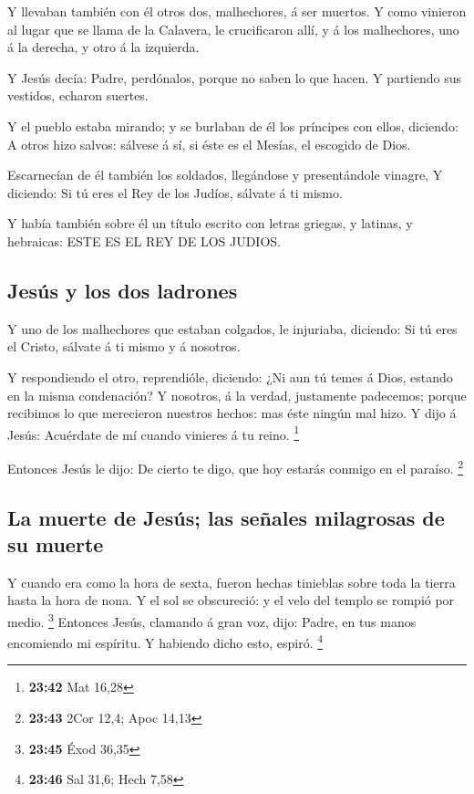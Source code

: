  Y llevaban también con él otros dos, malhechores, á ser
muertos.  Y como vinieron al lugar que se llama de la
Calavera, le crucificaron allí, y á los malhechores, uno á la derecha, y
otro á la izquierda.

 Y Jesús decía: Padre, perdónalos, porque no saben lo que
hacen. Y partiendo sus vestidos, echaron suertes.

 Y el pueblo estaba mirando; y se burlaban de él los
príncipes con ellos, diciendo: A otros hizo salvos: sálvese á sí, si
éste es el Mesías, el escogido de Dios.

 Escarnecían de él también los soldados, llegándose y
presentándole vinagre,  Y diciendo: Si tú eres el Rey de
los Judíos, sálvate á ti mismo.

 Y había también sobre él un título escrito con letras
griegas, y latinas, y hebraicas: ESTE ES EL REY DE LOS JUDIOS.

\hypertarget{jesuxfas-y-los-dos-ladrones}{%
\subsection{Jesús y los dos
ladrones}\label{jesuxfas-y-los-dos-ladrones}}

 Y uno de los malhechores que estaban colgados, le
injuriaba, diciendo: Si tú eres el Cristo, sálvate á ti mismo y á
nosotros.

 Y respondiendo el otro, reprendióle, diciendo: ¿Ni aun
tú temes á Dios, estando en la misma condenación?  Y
nosotros, á la verdad, justamente padecemos; porque recibimos lo que
merecieron nuestros hechos: mas éste ningún mal hizo.  Y
dijo á Jesús: Acuérdate de mí cuando vinieres á tu reino. \footnote{\textbf{23:42}
  Mat 16,28}

 Entonces Jesús le dijo: De cierto te digo, que hoy
estarás conmigo en el paraíso. \footnote{\textbf{23:43} 2Cor 12,4; Apoc
  14,13}

\hypertarget{la-muerte-de-jesuxfas-las-seuxf1ales-milagrosas-de-su-muerte}{%
\subsection{La muerte de Jesús; las señales milagrosas de su
muerte}\label{la-muerte-de-jesuxfas-las-seuxf1ales-milagrosas-de-su-muerte}}

 Y cuando era como la hora de sexta, fueron hechas
tinieblas sobre toda la tierra hasta la hora de nona.  Y
el sol se obscureció: y el velo del templo se rompió por medio.
\footnote{\textbf{23:45} Éxod 36,35}  Entonces Jesús,
clamando á gran voz, dijo: Padre, en tus manos encomiendo mi espíritu. Y
habiendo dicho esto, espiró. \footnote{\textbf{23:46} Sal 31,6; Hech
  7,58}

